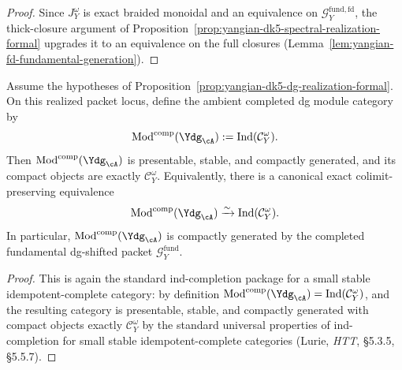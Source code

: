 \begin{proof}
Since \(J_Y^\omega\) is exact braided monoidal and an equivalence on
\(\mathcal{G}^{\mathrm{fund,fd}}_{Y}\), the thick-closure argument of
Proposition~\ref{prop:yangian-dk5-spectral-realization-formal} upgrades
it to an equivalence on the full closures
(Lemma~\ref{lem:yangian-fd-fundamental-generation}).
\end{proof}

\begin{corollary}
\label{cor:yangian-dk5-dg-packet-ind}
Assume the hypotheses of
Proposition~\ref{prop:yangian-dk5-dg-realization-formal}. On this
realized packet locus, define the ambient completed dg module category
by
\[
\operatorname{Mod}^{\mathrm{comp}}(\Ydg_{\cA})
:=
\operatorname{Ind}(\mathcal{C}_Y^\omega).
\]
Then \(\operatorname{Mod}^{\mathrm{comp}}(\Ydg_{\cA})\) is presentable,
stable, and compactly generated, and its compact objects are exactly
\(\mathcal{C}_Y^\omega\). Equivalently, there is a canonical exact
colimit-preserving equivalence
\[
\operatorname{Mod}^{\mathrm{comp}}(\Ydg_{\cA})
\xrightarrow{\sim}
\operatorname{Ind}(\mathcal{C}_Y^\omega).
\]
In particular, \(\operatorname{Mod}^{\mathrm{comp}}(\Ydg_{\cA})\) is
compactly generated by the completed fundamental dg-shifted packet
\(\mathcal{G}^{\mathrm{fund}}_{Y}\).

\end{corollary}

\begin{proof}
This is again the standard ind-completion package for a small stable
idempotent-complete category: by definition
\(\operatorname{Mod}^{\mathrm{comp}}(\Ydg_{\cA})
= \operatorname{Ind}(\mathcal{C}_Y^\omega)\), and the resulting
category is presentable, stable, and compactly generated with compact
objects exactly \(\mathcal{C}_Y^\omega\) by the standard universal
properties of ind-completion for small stable idempotent-complete
categories \textup{(}Lurie, \emph{HTT}, \S5.3.5, \S5.5.7\textup{)}.
\end{proof}

